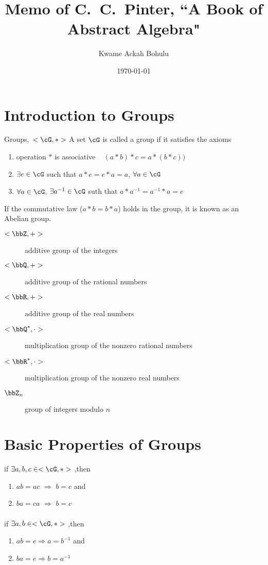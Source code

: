 \documentclass[11pt, oneside, dvipdfmx]{book}
\title{Memo of C.~C.~Pinter, ``A Book of Abstract Algebra"}
\author{Kwame Ackah Bohulu}
\date{\today}
\begin{document}
\maketitle
\section{Introduction to Groups}
\begin{MyDefinition}{Groups,~$< \cG, * >$}
A set $\cG$ is called a group if it satisfies the axioms
 \begin{enumerate}
 \item operation $*$ is associative  \ie~ $(a*b) * c = a* (b * c ))$
 \item $\exists e\in \cG$ such that $a * e = e * a =a$, $\forall a \in \cG$
 \item $\forall a\in \cG$, $\exists a^{-1}\in \cG$ suth that
 $a * a^{-1} = a^{-1} * a  = e$
\end{enumerate}
If the commutative law ($a * b = b * a$) holds in the group, it is known as an Abelian group.
\end{MyDefinition}

\begin{description}
  \item[$<\bbZ,+>$] additive group of the integers
  \item[$<\bbQ,+>$] additive group of the rational numbers
  \item[$<\bbR,+>$] additive group of the real numbers
  \item[$<\bbQ^*,\cdot>$] multiplication group of the nonzero rational numbers
  \item[$<\bbR^*,\cdot>$] multiplication group of the nonzero real numbers
  \item[$\bbZ_n$] group of integers modulo $n$
\end{description}
\section{Basic Properties of Groups}
\begin{MyTheorem}
	if $\exists a,b,c \in < \cG, * >$
	,then
	\begin{enumerate}
		\item $ab=ac$ $\Rightarrow$ $b=c$ and
		\item $ba=ca$ $\Rightarrow$ $b=c$
	\end{enumerate}
\end{MyTheorem}

\paragraph{}
\begin{MyTheorem}
	if $\exists a,b \in < \cG, * >$
	,then
	\begin{enumerate}
		\item $ab =e \Rightarrow a=b^{-1}$ and
		\item $ba =e \Rightarrow b=a^{-1}$
	\end{enumerate}
\end{MyTheorem}
\end{document}
